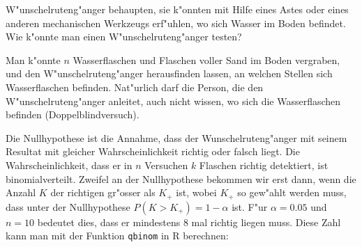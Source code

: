W"unschelruteng"anger behaupten, sie k"onnten mit Hilfe eines Astes
oder eines anderen mechanischen Werkzeugs erf"uhlen, wo sich Wasser
im Boden befindet. Wie k"onnte man einen W"unschelruteng"anger testen?

\begin{loesung}
Man k"onnte $n$ Wasserflaschen und Flaschen voller Sand im Boden vergraben,
und den W"unschelruteng"anger herausfinden lassen, an welchen Stellen
sich Wasserflaschen befinden. Nat"urlich darf die Person, die den
W"unschelruteng"anger anleitet, auch nicht wissen, wo sich die
Wasserflaschen befinden (Doppelblindversuch).

Die Nullhypothese ist die Annahme, dass der Wunschelruteng"anger mit
seinem Resultat mit
gleicher Wahrscheinlichkeit richtig oder falsch liegt.
Die Wahrscheinlichkeit, dass er  in $n$ Versuchen
$k$ Flaschen richtig detektiert, ist
binomialverteilt. Zweifel an der Nullhypothese bekommen wir erst
dann, wenn die Anzahl $K$ der richtigen gr"osser als $K_+$ ist, wobei
$K_+$ so gew"ahlt werden muss, dass unter der Nullhypothese
$P(K>K_+)=1-\alpha$ ist. F"ur $\alpha=0.05$ und $n=10$ bedeutet
dies, dass er mindestens 8 mal richtig liegen muss. Diese Zahl
kann man mit der Funktion {\tt qbinom} in R berechnen:
\end{loesung}

